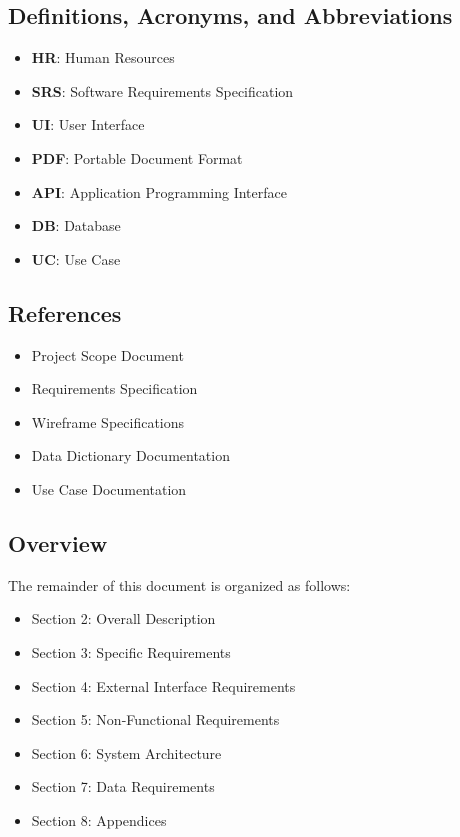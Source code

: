\documentclass[12pt,a4paper]{article}
\begin{document}
\subsection{Definitions, Acronyms, and Abbreviations}
\begin{itemize}
    \item \textbf{HR}: Human Resources
    \item \textbf{SRS}: Software Requirements Specification
    \item \textbf{UI}: User Interface
    \item \textbf{PDF}: Portable Document Format
    \item \textbf{API}: Application Programming Interface
    \item \textbf{DB}: Database
    \item \textbf{UC}: Use Case
\end{itemize}

\subsection{References}
\begin{itemize}
    \item Project Scope Document
    \item Requirements Specification
    \item Wireframe Specifications
    \item Data Dictionary Documentation
    \item Use Case Documentation
\end{itemize}

\subsection{Overview}
The remainder of this document is organized as follows:
\begin{itemize}
    \item Section 2: Overall Description
    \item Section 3: Specific Requirements
    \item Section 4: External Interface Requirements
    \item Section 5: Non-Functional Requirements
    \item Section 6: System Architecture
    \item Section 7: Data Requirements
    \item Section 8: Appendices
\end{itemize}
\end{document}
